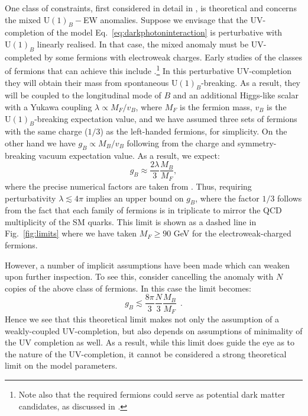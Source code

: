 \documentclass[withindex,glossary]{cam-thesis}
\begin{document}
One class of constraints, first considered in detail in
\cite{Dobrescu:2014fca}, is theoretical and concerns the mixed $\text{U}(1)_B-$EW anomalies.  Suppose we envisage that the UV-completion of the model Eq.~\eqref{eq:darkphotoninteraction} is perturbative with $\text{U}(1)_B$ linearly realised.  In that case, the mixed anomaly must be UV-completed by some fermions with electroweak charges.  Early studies of the classes of fermions that can achieve this include \cite{Duerr:2013dza,FileviezPerez:2014lnj}.\footnote{Note also that the required fermions could serve as potential dark matter candidates, as discussed in \cite{FileviezPerez:2019jju,Perez:2020jyg,Perez:2021rbo}.}   In this perturbative UV-completion they will obtain their mass from spontaneous $\text{U}(1)_B$-breaking.  As a result, they will be coupled to the longitudinal mode of $B$ and an additional Higgs-like scalar with a Yukawa coupling $\lambda \propto M_F/v_B$, where $M_F$ is the fermion mass, $v_B$ is the $\text{U}(1)_B$-breaking expectation value, and we have assumed three sets of fermions with the same charge ($1/3$) as the left-handed fermions, for simplicity.  On the other hand we have $g_B  \propto M_B/v_B$ following from the charge and symmetry-breaking vacuum expectation value.  As a result, we expect:
\begin{equation}
g_B \approx \frac{2 \lambda}{3} \frac{M_B}{M_F},
\end{equation}
where the precise numerical factors are taken from \cite{Dobrescu:2014fca}.  Thus, requiring perturbativity $\lambda \lesssim 4 \pi$ implies an upper bound on $g_B$, where the factor $1/3$ follows from the fact that each family of fermions is in triplicate to mirror the QCD multiplicity of the SM quarks.  This limit is shown as a dashed line in Fig.~\ref{fig:limits} where we have taken $M_F\geq 90$ GeV for the electroweak-charged fermions. 

However, a number of implicit assumptions have been made which can weaken upon further inspection.  To see this, consider cancelling the anomaly with $N$ copies of the above class of fermions.  In this case the limit becomes:
\begin{equation}
g_B \lesssim \frac{8 \pi}{3} \frac{N}{3} \frac{M_B}{M_F} ~~.
\end{equation}
Hence we see that this theoretical limit makes not only the assumption of a weakly-coupled UV-completion, but also depends on assumptions of minimality of the UV completion as well.  As a result, while this limit does guide the eye as to the nature of the UV-completion, it cannot be considered a strong theoretical limit on the model parameters.
\end{document}
